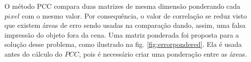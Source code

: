 O método PCC compara duas matrizes de mesma dimensão ponderando cada $pixel$ com o mesmo valor. 
Por consequência, o valor de correlação se reduz visto que existem áreas de erro sendo usadas na comparação
dando, assim, uma falsa impressão do objeto fora da cena. 
Uma matriz ponderada foi proposta para a solução desse problema, como ilustrado na fig. \ref{fig:errorpondered}. 
Ela é usada antes do cálculo do $PCC$, pois é necessário criar uma ponderação entre as áreas.


